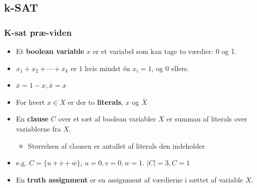 \documentclass{beamer}
\begin{document}
\subsection{k-SAT}
\label{subsec:label}

\begin{frame}
  \frametitle{K-sat præ-viden}
 \begin{itemize}
 \item Et \textbf{boolean variable} $x$ er et variabel som kan tage to værdier: 0 og 1. 
 \item $x_{1} + x_{2} + \cdots + x_{k}$ er $1$ hvis mindst én $x_{i} = 1$, og 0 ellers. 
 \item $\overline{x} = 1 - x, \overline{\overline{x}} = x$
 \item For hvert $x \in X$ er der to \textbf{literals}, $x$ og $\overline{X}$
 \item En \textbf{clause} $C$ over et sæt af boolean variabler $X$ er summan af literals over variablerne fra $X$.
   \begin{itemize}
   \item Størrelsen af clausen er antallet af literals den indeholder
   \end{itemize}
   \item e.g. $C = \{u + \overline{v} + \overline{w}\}$, $u = 0, v = 0, w = 1$. $|C| = 3, C = 1$
   \item En \textbf{truth assignment} er en assignment af værdierne i sættet af variable $X$. 
 \end{itemize} 
\end{frame}
\end{document}
